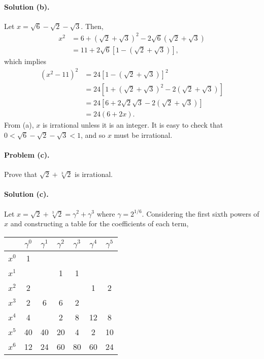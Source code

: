 \documentclass{article}
\begin{document}
\paragraph{Solution (b).} Let $x = \sqrt{6} - \sqrt{2} - \sqrt{3}$. Then, \begin{align*}
  x^2 &= 6 + (\sqrt{2} + \sqrt{3})^2 - 2\sqrt{6}(\sqrt{2} + \sqrt{3}) \\
      &= 11 + 2\sqrt{6}[1 - (\sqrt{2} + \sqrt{3})],
\end{align*} which implies \begin{align*}
  (x^2 - 11)^2 &= 24[1 - (\sqrt{2} + \sqrt{3})]^2 \\
               &= 24[1 + (\sqrt{2} + \sqrt{3})^2 - 2(\sqrt{2} + \sqrt{3})] \\
               &= 24[6 + 2\sqrt{2}\sqrt{3} - 2(\sqrt{2} + \sqrt{3})] \\
               &= 24(6 + 2x).
\end{align*} From (a), $x$ is irrational unless it is an integer. It is easy to check that $0 < \sqrt{6} - \sqrt{2} - \sqrt{3} < 1$, and so $x$ must be irrational.

\paragraph{Problem (c).} Prove that $\sqrt{2} + \sqrt[3]{2}$ is irrational.

\paragraph{Solution (c).} Let $x = \sqrt{2} + \sqrt[3]{2} = \gamma^2 + \gamma^3$ where $\gamma = 2^{1/6}$. Considering the first sixth powers of $x$ and constructing a table for the coefficients of each term,

\begin{tabular}{c | c c c c c c}
  & $\gamma^0$ & $\gamma^1$ & $\gamma^2$ & $\gamma^3$ & $\gamma^4$ & $\gamma^5$ \\
  \hline
  $x^0$ & 1 & & & & & \\
  $x^1$ & & & 1 & 1 & & \\
  $x^2$ & 2 & & & & 1 & 2 \\
  $x^3$ & 2 & 6 & 6 & 2 & & \\
  $x^4$ & 4 & & 2 & 8 & 12 & 8 \\
  $x^5$ & 40 & 40 & 20 & 4 & 2 & 10 \\
  $x^6$ & 12 & 24 & 60 & 80 & 60 & 24 \\
\end{tabular}
\end{document}
